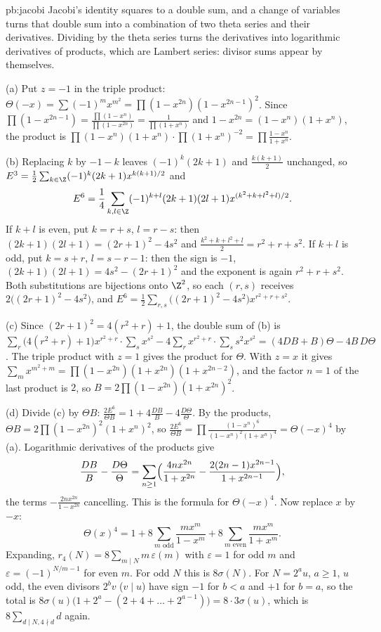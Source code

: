 \begin{solution}{pb:jacobi}
\idea Jacobi's identity squares to a double sum, and a change of variables turns that double sum into a combination of two theta series and their derivatives. Dividing
by the theta series turns the derivatives into logarithmic derivatives of products, which are Lambert series: divisor sums appear by themselves.

\writeup (a) Put $z=-1$ in the triple product: $\Theta(-x)=\sum(-1)^mx^{m^2}=\prod(1-x^{2n})(1-x^{2n-1})^2$. Since $\prod(1-x^{2n-1})=\frac{\prod(1-x^n)}{\prod(1-x^{2n})}=\frac1{\prod(1+x^n)}$
and $1-x^{2n}=(1-x^n)(1+x^n)$, the product is $\prod(1-x^n)(1+x^n)\cdot\prod(1+x^n)^{-2}=\prod\frac{1-x^n}{1+x^n}$.

(b) Replacing $k$ by $-1-k$ leaves $(-1)^k(2k+1)$ and $\frac{k(k+1)}2$ unchanged, so $E^3=\frac12\sum_{k\in\Z}(-1)^k(2k+1)x^{k(k+1)/2}$ and
\[
E^6=\frac14\sum_{k,l\in\Z}(-1)^{k+l}(2k+1)(2l+1)x^{(k^2+k+l^2+l)/2}.
\]
If $k+l$ is even, put $k=r+s$, $l=r-s$: then $(2k+1)(2l+1)=(2r+1)^2-4s^2$ and $\frac{k^2+k+l^2+l}2=r^2+r+s^2$. If $k+l$ is odd, put $k=s+r$, $l=s-r-1$: then the sign is $-1$,
$(2k+1)(2l+1)=4s^2-(2r+1)^2$ and the exponent is again $r^2+r+s^2$. Both substitutions are bijections onto $\Z^2$, so each $(r,s)$ receives $2\bigl((2r+1)^2-4s^2\bigr)$, and
$E^6=\frac12\sum_{r,s}\bigl((2r+1)^2-4s^2\bigr)x^{r^2+r+s^2}$.

(c) Since $(2r+1)^2=4(r^2+r)+1$, the double sum of (b) is $\sum_r\bigl(4(r^2+r)+1\bigr)x^{r^2+r}\cdot\sum_sx^{s^2}-4\sum_rx^{r^2+r}\cdot\sum_ss^2x^{s^2}=(4DB+B)\Theta-4B\,D\Theta$.
The triple product with $z=1$ gives the product for $\Theta$. With $z=x$ it gives $\sum_mx^{m^2+m}=\prod(1-x^{2n})(1+x^{2n})(1+x^{2n-2})$, and the factor $n=1$ of the last product is
$2$, so $B=2\prod(1-x^{2n})(1+x^{2n})^2$.

(d) Divide (c) by $\Theta B$: $\frac{2E^6}{\Theta B}=1+4\frac{DB}B-4\frac{D\Theta}\Theta$. By the products,
$\Theta B=2\prod(1-x^{2n})^2(1+x^n)^2$, so $\frac{2E^6}{\Theta B}=\prod\frac{(1-x^n)^6}{(1-x^n)^2(1+x^n)^4}=\Theta(-x)^4$ by (a). Logarithmic derivatives of the products give
\[
\frac{DB}B-\frac{D\Theta}\Theta=\sum_{n\ge1}\Bigl(\frac{4nx^{2n}}{1+x^{2n}}-\frac{2(2n-1)x^{2n-1}}{1+x^{2n-1}}\Bigr),
\]
the terms $-\frac{2nx^{2n}}{1-x^{2n}}$ cancelling. This is the formula for $\Theta(-x)^4$. Now replace $x$ by $-x$:
\[
\Theta(x)^4=1+8\sum_{m\text{ odd}}\frac{mx^m}{1-x^m}+8\sum_{m\text{ even}}\frac{mx^m}{1+x^m}.
\]
Expanding, $r_4(N)=8\sum_{m\mid N}m\,\varepsilon(m)$ with $\varepsilon=1$ for odd $m$ and $\varepsilon=(-1)^{N/m-1}$ for even $m$. For odd $N$ this is $8\sigma(N)$. For
$N=2^au$, $a\ge1$, $u$ odd, the even divisors $2^bv$ ($v\mid u$) have sign $-1$ for $b<a$ and $+1$ for $b=a$, so the total is
$8\sigma(u)\bigl(1+2^a-(2+4+\dots+2^{a-1})\bigr)=8\cdot3\sigma(u)$, which is $8\sum_{d\mid N,4\nmid d}d$ again.


\end{solution}
